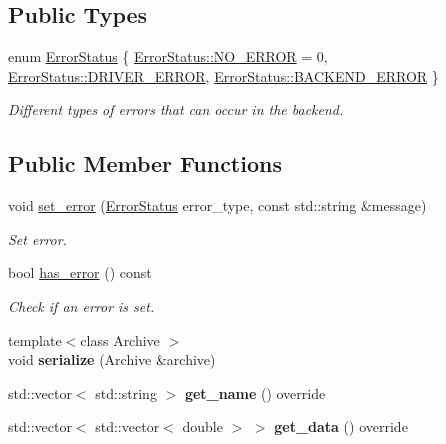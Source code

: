 \subsection*{Public Types}
\begin{DoxyCompactItemize}
\item 
enum \hyperlink{structrobot__interfaces_1_1Status_a88f1cb8387648815ca75754985bdb3b6}{Error\+Status} \{ \hyperlink{structrobot__interfaces_1_1Status_a88f1cb8387648815ca75754985bdb3b6ad306b6fdee05fe87455110ddf6501e6c}{Error\+Status\+::\+N\+O\+\_\+\+E\+R\+R\+OR} = 0, 
\hyperlink{structrobot__interfaces_1_1Status_a88f1cb8387648815ca75754985bdb3b6a5cd5516428d081129a4aea1db455272e}{Error\+Status\+::\+D\+R\+I\+V\+E\+R\+\_\+\+E\+R\+R\+OR}, 
\hyperlink{structrobot__interfaces_1_1Status_a88f1cb8387648815ca75754985bdb3b6ac44598cc3395b73e9fd2866f42945bd3}{Error\+Status\+::\+B\+A\+C\+K\+E\+N\+D\+\_\+\+E\+R\+R\+OR}
 \}\begin{DoxyCompactList}\small\item\em Different types of errors that can occur in the backend. \end{DoxyCompactList}
\end{DoxyCompactItemize}
\subsection*{Public Member Functions}
\begin{DoxyCompactItemize}
\item 
void \hyperlink{structrobot__interfaces_1_1Status_aa5bbec49d6faba7507abc8772dec505d}{set\+\_\+error} (\hyperlink{structrobot__interfaces_1_1Status_a88f1cb8387648815ca75754985bdb3b6}{Error\+Status} error\+\_\+type, const std\+::string \&message)
\begin{DoxyCompactList}\small\item\em Set error. \end{DoxyCompactList}\item 
bool \hyperlink{structrobot__interfaces_1_1Status_a83507b0921dc1e67e690b34daa3bcbc3}{has\+\_\+error} () const
\begin{DoxyCompactList}\small\item\em Check if an error is set. \end{DoxyCompactList}\item 
\mbox{\label{structrobot__interfaces_1_1Status_a5531f83e2ef30f7629548194b4e3e9da}} 
{\footnotesize template$<$class Archive $>$ }\\void {\bfseries serialize} (Archive \&archive)
\item 
\mbox{\label{structrobot__interfaces_1_1Status_a2cd6543deb86d878ba43153c18d2fadb}} 
std\+::vector$<$ std\+::string $>$ {\bfseries get\+\_\+name} () override
\item 
\mbox{\label{structrobot__interfaces_1_1Status_af530134f33fa21c02d1157636c385fa3}} 
std\+::vector$<$ std\+::vector$<$ double $>$ $>$ {\bfseries get\+\_\+data} () override
\end{DoxyCompactItemize}
